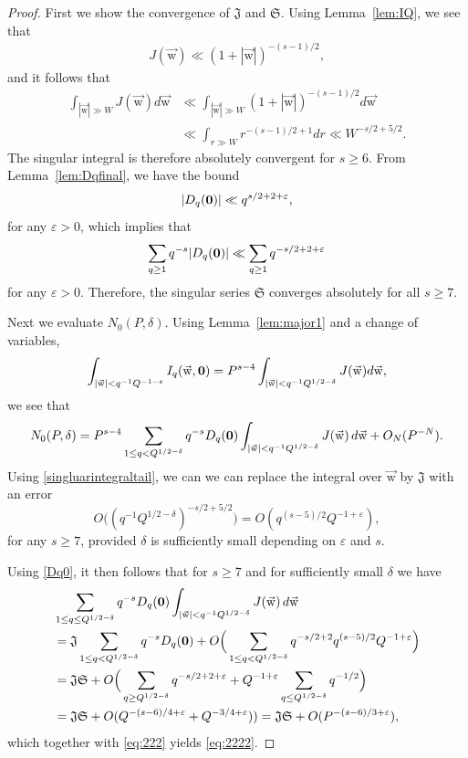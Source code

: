\documentclass[letterpaper,11pt]{amsart}
\numberwithin{equation}{section}
\theoremstyle{definition}
\numberwithin{equation}{section}
\newcommand{\uw}{{\vec{\mathrm{w}}}}
\def\vecnull{{\text{\boldmath$0$}}}
\newcommand{\ve}{\varepsilon}
\begin{document}
\begin{proof}
First we show the convergence of $\mathfrak J$ and $\mathfrak S$.
Using Lemma~\ref{lem:IQ}, we see that 
\begin{align*}
J(\uw)\ll (1+|\uw|)^{-(s-1)/2},
\end{align*}
and it follows that 
\begin{align}\nonumber
\int_{|\uw| \gg W}J(\uw)d\uw &\ll \int_{|\uw|\gg W}(1+|\uw|)^{-(s-1)/2}d\uw \\ &\ll \int_{r\gg W}r^{-(s-1)/2+1}dr\ll W^{-s/2+5/2}.
\label{singluarintegraltail}
\end{align}
The singular integral is therefore absolutely convergent for $s\geq 6$.
From Lemma~\ref{lem:Dqfinal},
we have the bound \begin{equation}
\label{Dq0}
|D_q(\vecnull)|\ll q^{s/2+2+\varepsilon},
\end{equation}
for any $\varepsilon>0$, which implies that 
\begin{align*}
\sum_{q\geq 1}q^{-s}|D_q(\vecnull)|\ll \sum_{q\geq 1}q^{-s/2+2+\varepsilon}
\end{align*}
for any $\varepsilon>0$.
Therefore, the singular series $\mathfrak{S}$ converges absolutely for all $s\geq 7$.

Next we evaluate $N_0(P, \delta)$. 
Using Lemma~\ref{lem:major1}
and a change of variables,
\begin{align*}
\int_{|\uw|<q^{-1}Q^{-1-\ve}} I_q(\uw,\vecnull)=P^{s-4}\int_{|\uw|<q^{-1}Q^{1/2-\delta}}J(\uw)d\uw,
\end{align*}	
we see that 
\begin{equation}
\label{eq:222}
N_0(P, \delta)=P^{s-4}\sum_{1\leq q< Q^{1/2-\delta}}q^{-s}
			D_q(\vecnull)			
			\int_{|\uw|<q^{-1}Q^{1/2-\delta}} J(\uw)
			\,d\uw+O_{N}(P^{-N}).
\end{equation}
Using \eqref{singluarintegraltail}, we can
we can replace the integral over $\uw$ by $\mathfrak J$ with an error $$O\big((q^{-1}Q^{1/2-\delta})^{-s/2+5/2}\big)=O(q^{(s-5)/2}Q^{-1+ \varepsilon}),$$ for any $s\geq 7$, provided \(\delta\) is sufficiently small depending on $\varepsilon$ and $s$.

Using \eqref{Dq0}, it then follows that for $s\geq 7$ and for sufficiently small \(\delta\) we have
\begin{align*}
&\sum_{1\leq q\leq Q^{1/2-\delta}}q^{-s} D_q(\vecnull) \int_{|\uw|<q^{-1}Q^{1/2-\delta}} J(\uw)\,d\uw\\
&=\mathfrak{J}\sum_{1\leq q< Q^{1/2-\delta}}q^{-s}
			D_q(\vecnull)			
			+O\Big(\sum_{1\leq q< Q^{1/2-\delta}}q^{-s/2+2}q^{(s-5)/2}Q^{-1+\varepsilon}\Big)\\
&=\mathfrak{JS}+O\Big(\sum_{q\geq Q^{1/2-\delta}} q^{-s/2+2+\varepsilon}+Q^{-1+\varepsilon}\sum_{q\leq Q^{1/2-\delta}}q^{-1/2} \Big)\\
&=\mathfrak{JS}+O(Q^{-(s-6)/4+\varepsilon}+Q^{-3/4+ \varepsilon}))=\mathfrak{JS}+O(P^{-(s-6)/3+\ve}),
\end{align*}
 which together with \eqref{eq:222} yields \eqref{eq:2222}.
\end{proof} 
\end{document}

